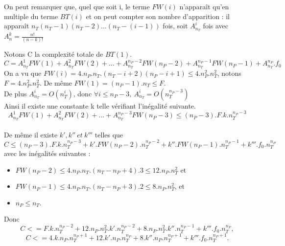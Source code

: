 \begin{pr}
On peut remarquer que, quel que soit i, le terme $FW(i)$ n'apparaît qu'en multiple du terme $BT(i)$ et on peut compter son
nombre d'apparition : il apparaît $n_T(n_T-1)(n_T-2)...(n_T-(i-1))$ fois, soit $A^{i}_{n_T}$ fois avec $A^k_n = \frac{n!}{(n-k)!}$


Notons C la complexité totale de $BT(1)$.
$$C=A^{1}_{n_T}FW(1)+A^{2}_{n_T}FW(2)+...+A^{n_P-2}_{n_T}FW(n_P-2)+A^{n_P-1}_{n_T}FW(n_P-1)+A^{n_P}_{n_T}.f_0$$
On a vu que $FW(i)=4.n_P.n_T.(n_T-i+2)(n_P-i+1)\leq 4.n_P^2.n_T^2$, notons~$F=4.n_P^2.n_T^2$. De même $FW(1)=(n_P-1).n_T\leq F$.
\\
De plus $A^{i}_{n_T}=O(n_T^i)$, donc $\forall i\le n_P-3,\ A^{i}_{n_T}=O(n_T^{n_P-3})$\\
Ainsi il existe une constante k telle vérifiant l'inégalité suivante.
$$A^{1}_{n_T}FW(1)+A^{2}_{n_T}FW(2)+...+A^{n_P-3}_{n_T}FW(n_P-3)\le(n_P-3).F.k.n_T^{n_P-3}$$
\\
De même il existe $k', k''\ et\ k'''$ telles que $$C\le(n_P-3).F.k.n_T^{n_P-3}+k'.FW(n_P-2).n_T^{n_P-2}+k''.FW(n_P-1).n_T^{n_P-1}+k'''.f_0.n_T^{n_P}$$
avec les inégalités suivantes :
\begin{itemize}
 \item $FW(n_P-2)\le 4.n_P.n_T.(n_T-n_P+4).3\le 12.n_P.n_T^2$ et
 \item $FW(n_P-1)\le 4.n_P.n_T.(n_T-n_P+3).2\le 8.n_P.n_T^2$, et
 \item $n_P\le n_T$.
\end{itemize}

Donc $$C<=F.k.n_T^{n_P-2}+12.n_P.n_T^2.k'.n_T^{n_P-2}+8.n_P.n_T^2.k''.n_T^{n_P-1}+k'''.f_0.n_T^{n_P},$$
$$C<=4.k.n_P.n_T^{n_P+1}+12.k'.n_P.n_T^{n_P}+8.k''.n_P.n_T^{n_P+1}+k'''.f_0.n_T^{n_P+1}.$$

% 


\end{pr}
